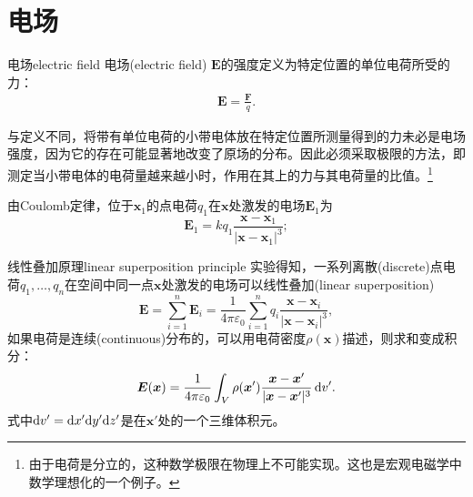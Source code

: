 
\section{电场}

\begin{definition}{电场}{electric field}
    电场(electric field) $\bm E$的强度定义为特定位置的单位电荷所受的力：
    \begin{align}
        \bm E=\frac{\bm F}q.%
    \end{align}
\end{definition}
\begin{remark}
    与定义不同，将带有单位电荷的小带电体放在特定位置所测量得到的力未必是电场强度，因为它的存在可能显著地改变了原场的分布。因此必须采取极限的方法，即测定当小带电体的电荷量越来越小时，作用在其上的力与其电荷量的比值。\footnote{由于电荷是分立的，这种数学极限在物理上不可能实现。这也是宏观电磁学中数学理想化的一个例子。}
\end{remark}

\begin{corollary}
    由Coulomb定律，位于$\bm x_1$的点电荷$q_1$在$\bm x$处激发的电场$\bm E_1$为
    \begin{equation}
        \label{eqn:E of q}
        \bm E_1=kq_1\frac{\bm x-\bm x_1}{|\bm x-\bm x_1|^3};
    \end{equation}
\end{corollary}
\begin{theorem}
    {线性叠加原理}{linear superposition principle}
    实验得知，一系列离散(discrete)点电荷$q_1,\ldots,q_n$在空间中同一点$\bm x$处激发的电场可以线性叠加(linear superposition)
    \begin{equation}
        \label{eqn:E(x) sum}
        \bm E=\sum_{i=1}^n\bm E_i=\frac1{4\pi\varepsilon_0}\sum_{i=1}^nq_i\frac{\bm x-\bm x_i}{|\bm x-\bm x_i|^3},
    \end{equation}
    如果电荷是连续(continuous)分布的，可以用电荷密度$\rho(\bm x)$描述，则求和变成积分：
    \begin{equation}
        \label{eqn:E(x)}
        \bm E(\bm x)=\frac1{4\pi\varepsilon_0}\int_V\rho(\bm x')\frac{\bm x-\bm x'}{|\bm x-\bm x'|^3}\mathop{}\!\mathrm{d} v'.
    \end{equation}
    式中$\mathop{}\!\mathrm{d} v'=\mathop{}\!\mathrm{d} x'\mathrm{d} y'\mathrm{d} z'$是在$\bm x'$处的一个三维体积元。
\end{theorem}

